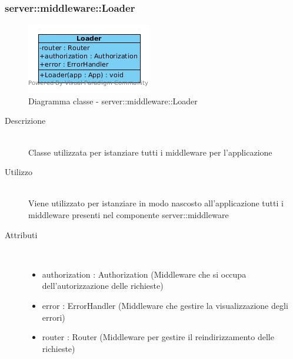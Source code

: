 \vspace{0.5cm}
\hypertarget{server::middleware::Loader}{}
\subsubsection[Loader]{server::middleware::Loader}
\begin{center}
			\begin{figure}[H]
				\centering \includegraphics[scale=4, max width=\textwidth, max height=\myheight]{../img/diagrammiClassi/server/middleware/Loader.png}
				\caption{Diagramma classe - server::middleware::Loader}
			\end{figure}
		\end{center}\begin{description}
\item[Descrizione] \hfill \\
 Classe utilizzata per istanziare tutti i middleware per l'applicazione
\item[Utilizzo] \hfill \\
 Viene utilizzato per istanziare in modo nascosto all’applicazione tutti i middleware presenti nel componente server::middleware
\item[Attributi] \hfill \\
 \vspace{-7mm}
\begin{itemize}
\item authorization : Authorization (Middleware che si occupa dell'autorizzazione delle richieste)
\item error : ErrorHandler (Middleware che gestire la visualizzazione degli errori)
\item router : Router (Middleware per gestire il reindirizzamento delle richieste)
\end{itemize}


\end{description}
